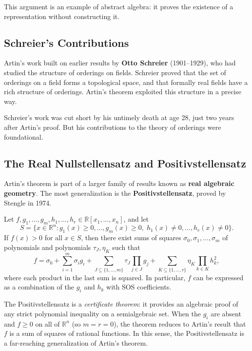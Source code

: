 This argument is an example of abstract algebra: it proves the existence of a representation without constructing it.

\subsection{Schreier's Contributions}

Artin's work built on earlier results by \textbf{Otto Schreier} (1901--1929), who had studied the structure of orderings on fields. Schreier proved that the set of orderings on a field forms a topological space, and that formally real fields have a rich structure of orderings. Artin's theorem exploited this structure in a precise way.

Schreier's work was cut short by his untimely death at age 28, just two years after Artin's proof. But his contributions to the theory of orderings were foundational.

\subsection{The Real Nullstellensatz and Positivstellensatz}

Artin's theorem is part of a larger family of results known as \textbf{real algebraic geometry}. The most generalization is the \textbf{Positivstellensatz}, proved by Stengle in 1974.

\begin{theorem}\label{thm:positivstellensatz}
Let $f, g_1, \ldots, g_m, h_1, \ldots, h_r \in \mathbb{R}[x_1,\ldots,x_n]$, and let
\[
    S = \{x \in \mathbb{R}^n : g_1(x) \geq 0, \ldots, g_m(x) \geq 0,\; h_1(x) \neq 0, \ldots, h_r(x) \neq 0\}.
\]
If $f(x) > 0$ for all $x \in S$, then there exist sums of squares $\sigma_0, \sigma_1, \ldots, \sigma_m$ of polynomials and polynomials $\tau_J, \eta_K$ such that
\[
    f = \sigma_0 + \sum_{i=1}^m \sigma_i g_i + \sum_{J \subseteq \{1,\ldots,m\}} \tau_J \prod_{j \in J} g_j + \sum_{K \subseteq \{1,\ldots,r\}} \eta_K \prod_{k \in K} h_k^2,
\]
where each product in the last sum is squared. In particular, $f$ can be expressed as a combination of the $g_i$ and $h_k$ with SOS coefficients.
\end{theorem}

The Positivstellensatz is a \emph{certificate theorem}: it provides an algebraic proof of any strict polynomial inequality on a semialgebraic set. When the $g_i$ are absent and $f \geq 0$ on all of $\mathbb{R}^n$ (so $m = r = 0$), the theorem reduces to Artin's result that $f$ is a sum of squares of rational functions. In this sense, the Positivstellensatz is a far-reaching generalization of Artin's theorem.

